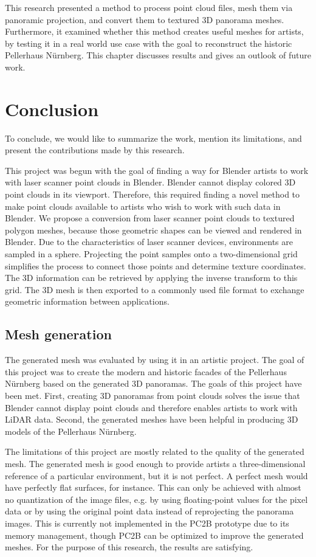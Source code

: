 This research presented a method to process point cloud files, mesh them via panoramic projection, and convert them to textured 3D panorama meshes. Furthermore, it examined whether this method creates useful meshes for artists, by testing it in a real world use case with the goal to reconstruct the historic Pellerhaus Nürnberg. This chapter discusses results and gives an outlook of future work.

\section{Conclusion}

To conclude, we would like to summarize the work, mention its limitations, and present the contributions made by this research.

This project was begun with the goal of finding a way for Blender artists to work with laser scanner point clouds in Blender. Blender cannot display colored 3D point clouds in its viewport. Therefore, this required finding a novel method to make point clouds available to artists who wish to work with such data in Blender. We propose a conversion from laser scanner point clouds to textured polygon meshes, because those geometric shapes can be viewed and rendered in Blender. Due to the characteristics of laser scanner devices, environments are sampled in a sphere. Projecting the point samples onto a two-dimensional grid simplifies the process to connect those points and determine texture coordinates. The 3D information can be retrieved by applying the inverse transform to this grid. The 3D mesh is then exported to a commonly used file format to exchange geometric information between applications.

\subsection{Mesh generation}

The generated mesh was evaluated by using it in an artistic project. The goal of this project was to create the modern and historic facades of the Pellerhaus Nürnberg based on the generated 3D panoramas. The goals of this project have been met. First, creating 3D panoramas from point clouds solves the issue that Blender cannot display point clouds and therefore enables artists to work with LiDAR data. Second, the generated meshes have been helpful in producing 3D models of the Pellerhaus Nürnberg.

The limitations of this project are mostly related to the quality of the generated mesh. The generated mesh is good enough to provide artists a three-dimensional reference of a particular environment, but it is not perfect. A perfect mesh would have perfectly flat surfaces, for instance. This can only be achieved with almost no quantization of the image files, e.g. by using floating-point values for the pixel data or by using the original point data instead of reprojecting the panorama images. This is currently not implemented in the PC2B prototype due to its memory management, though PC2B can be optimized to improve the generated meshes. For the purpose of this research, the results are satisfying.


